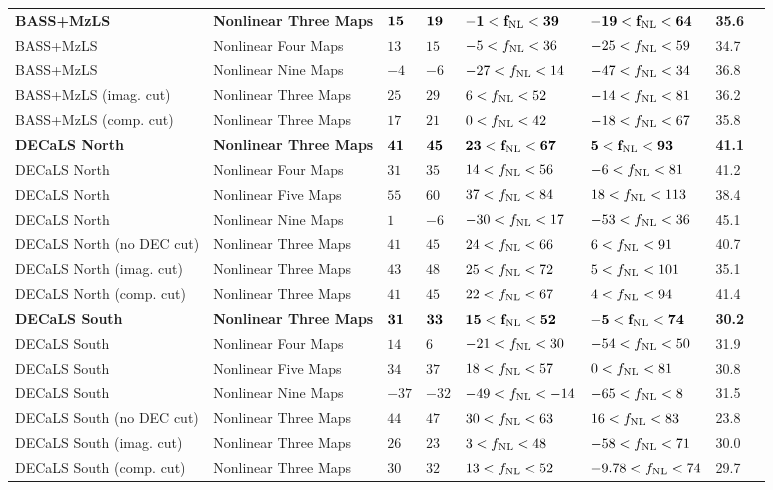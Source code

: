 \begin{table}
{\begin{tabular}{llllllll}
\hline
\bf{BASS+MzLS}                 & \bf{Nonlinear Three Maps}& $ \bf{15}$& $ \bf{19}$& $ \bf{-1<f_{\rm NL}< 39}$& $\bf{-19<f_{\rm NL}< 64}$ & \bf{35.6}\\
BASS+MzLS                 & Nonlinear Four Maps& $ 13$& $ 15$& $ -5<f_{\rm NL}< 36$& $-25<f_{\rm NL}< 59$ &   34.7\\
BASS+MzLS                 & Nonlinear Nine Maps& $ -4$& $ -6$& $-27<f_{\rm NL}< 14$& $-47<f_{\rm NL}< 34$ &   36.8\\
BASS+MzLS (imag. cut)     & Nonlinear Three Maps& $ 25$& $ 29$& $  6<f_{\rm NL}< 52$& $-14<f_{\rm NL}< 81$ &   36.2\\
BASS+MzLS (comp. cut)     & Nonlinear Three Maps& $ 17$& $ 21$& $  0<f_{\rm NL}< 42$& $-18<f_{\rm NL}< 67$ &   35.8\\
\bf{DECaLS North}              & \bf{Nonlinear Three Maps}& $ \bf{41}$& $ \bf{45}$& $ \bf{23<f_{\rm NL}< 67}$& $  \bf{5<f_{\rm NL}< 93}$ & \bf{41.1}\\
DECaLS North              & Nonlinear Four Maps& $ 31$& $ 35$& $ 14<f_{\rm NL}< 56$& $ -6<f_{\rm NL}< 81$ &   41.2\\
DECaLS North              & Nonlinear Five Maps& $ 55$& $ 60$& $ 37<f_{\rm NL}< 84$& $ 18<f_{\rm NL}<113$ &   38.4\\
DECaLS North              & Nonlinear Nine Maps& $  1$& $ -6$& $-30<f_{\rm NL}< 17$& $-53<f_{\rm NL}< 36$ &   45.1\\
DECaLS North (no DEC cut) & Nonlinear Three Maps& $ 41$& $ 45$& $ 24<f_{\rm NL}< 66$& $  6<f_{\rm NL}< 91$ &   40.7\\
DECaLS North (imag. cut)  & Nonlinear Three Maps& $ 43$& $ 48$& $ 25<f_{\rm NL}< 72$& $  5<f_{\rm NL}<101$ &   35.1\\
DECaLS North (comp. cut)  & Nonlinear Three Maps& $ 41$& $ 45$& $ 22<f_{\rm NL}< 67$& $  4<f_{\rm NL}< 94$ &   41.4\\
\bf{DECaLS South}              & \bf{Nonlinear Three Maps}& $ \bf{31}$& $ \bf{33}$& $ \bf{15<f_{\rm NL}< 52}$& $ \bf{-5<f_{\rm NL}< 74}$ &   \bf{30.2}\\
DECaLS South              & Nonlinear Four Maps& $ 14$& $  6$& $-21<f_{\rm NL}< 30$& $-54<f_{\rm NL}< 50$ &   31.9\\
DECaLS South              & Nonlinear Five Maps& $ 34$& $ 37$& $ 18<f_{\rm NL}< 57$& $ 0<f_{\rm NL}< 81$ &   30.8\\
DECaLS South              & Nonlinear Nine Maps& $-37$& $-32$& $-49<f_{\rm NL}<-14$& $-65<f_{\rm NL}<  8$ &   31.5\\
DECaLS South (no DEC cut) & Nonlinear Three Maps& $ 44$& $ 47$& $ 30<f_{\rm NL}< 63$& $ 16<f_{\rm NL}< 83$ &   23.8\\
DECaLS South (imag. cut)  & Nonlinear Three Maps& $ 26$& $ 23$& $  3<f_{\rm NL}< 48$& $-58<f_{\rm NL}< 71$ &   30.0\\
DECaLS South (comp. cut)  & Nonlinear Three Maps& $ 30$& $ 32$& $ 13<f_{\rm NL}< 52$& $ -9.78<f_{\rm NL}< 74$ &   29.7\\
   \hline
    \end{tabular}}
\end{table}



